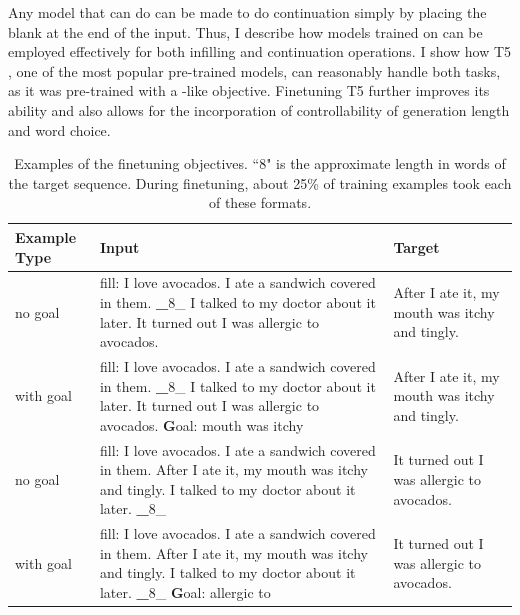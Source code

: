 Any model that can do \FitB{} can be made to do continuation simply by placing the blank at the end of the input.
Thus, I describe how models trained on \FitB{} can be employed effectively for both infilling and continuation operations.
I show how T5 \citep{raffel2019exploring}, one of the most popular pre-trained models, can reasonably handle both tasks, as it was pre-trained with a \FitB-like objective.
Finetuning T5 further improves its ability and also allows for the incorporation of controllability of generation length and word choice.


\begin{table}[t]
  \centering
  \small
  \caption{Examples of the finetuning objectives. ``8" is the approximate length in words of the target sequence. During finetuning, about 25\% of training examples took each of these formats.}
    \begin{tabular}{p{}p{}p{}}
    \midrule
    Example Type & Input & Target \\
    \midrule
     \cFITB{} no goal & fill: I love avocados. I ate a sandwich covered in them. {\textbf \_8\_} I talked to my doctor about it later. It turned out I was allergic to avocados. & After I ate it, my mouth was itchy and tingly. \\
    \midrule
     \cFITB{}  with goal & fill: I love avocados. I ate a sandwich covered in them.  {\textbf \_8\_} I talked to my doctor about it later. It turned out I was allergic to avocados.  {\textbf Goal: mouth was itchy} & After I ate it, my mouth was itchy and tingly. \\
    \midrule
     \cFITB{} no goal& fill: I love avocados. I ate a sandwich covered in them. After I ate it, my mouth was itchy and tingly. I talked to my doctor about it later.  {\textbf \_8\_}  & It turned out I was allergic to avocados. \\
    \midrule
     \cFITE{} with goal & fill: I love avocados. I ate a sandwich covered in them. After I ate it, my mouth was itchy and tingly. I talked to my doctor about it later.  {\textbf \_8\_}   {\textbf Goal: allergic to} & It turned out I was allergic to avocados. \\
    \midrule
    \end{tabular}
  \label{tab:task_examples}
\end{table}%

